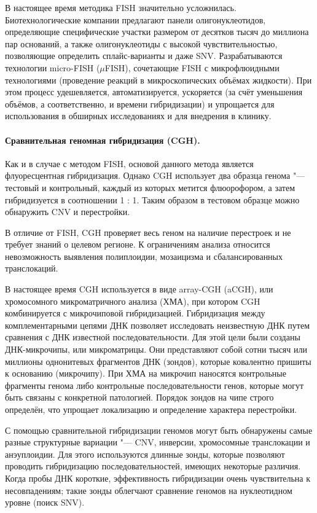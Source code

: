 \documentclass[a4paper,12pt]{article}
\begin{document}
В настоящее время методика FISH значительно усложнилась.
Биотехнологические компании предлагают панели олигонуклеотидов, определяющие специфические участки размером от десятков тысяч до миллиона пар оснований, а также олигонуклеотиды с высокой чувствительностью, позволяющие определить сплайс-варианты и даже SNV.
Разрабатываются технологии micro-FISH ($\mu$FISH), сочетающие FISH с микрофлюидными технологиями (проведение реакций в микроскопических объёмах жидкости).
При этом процесс удешевляется, автоматизируется, ускоряется (за счёт уменьшения объёмов, а соответственно, и времени гибридизации) и упрощается для использования в обширных исследованиях и для внедрения в клинику\cite{huber}.

\paragraph{Сравнительная геномная гибридизация (CGH).}
Как и в случае с методом FISH, основой данного метода является флуоресцентная гибридизация.
Однако CGH использует два образца генома "--- тестовый и контрольный, каждый из которых метится флюорофором, а затем гибридизуется в соотношении 1 : 1.
Таким образом в тестовом образце можно обнаружить CNV и перестройки.

В отличие от FISH, CGH проверяет весь геном на наличие перестроек и не требует знаний о целевом регионе.
К ограничениям анализа относится невозможность выявления полиплоидии, мозаицизма и сбалансированных транслокаций.

В настоящее время CGH используется в виде array-CGH (aCGH), или хромосомного микроматричного анализа (ХМА), при котором CGH комбинируется с микрочиповой гибридизацией\cite{theisen}.
Гибридизация между комплементарными цепями ДНК позволяет исследовать неизвестную ДНК путем сравнения с ДНК известной последовательности.
Для этой цели были созданы ДНК-микрочипы, или микроматрицы.
Они представляют собой сотни тысяч или миллионы однонитевых фрагментов ДНК (зондов), которые ковалентно пришиты к основанию (микрочипу).
При ХМА на микрочип наносятся контрольные фрагменты генома либо контрольные последовательности генов, которые могут быть связаны с конкретной патологией.
Порядок зондов на чипе строго определён, что упрощает локализацию и определение характера перестройки.
    
С помощью сравнительной гибридизации геномов могут быть обнаружены самые разные структурные вариации "--- CNV, инверсии, хромосомные транслокации и анэуплоидии.
Для этого используются длинные зонды, которые позволяют проводить гибридизацию последовательностей, имеющих некоторые различия.
Когда пробы ДНК короткие, эффективность гибридизации очень чувствительна к несовпадениям; такие зонды облегчают сравнение геномов на нуклеотидном уровне (поиск SNV).
\end{document}
